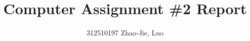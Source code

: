\documentclass[a4paper, onecolumn, , 11pt]{IEEEtran}
\begin{document}


    \title{\huge Computer Assignment \#2 Report}
    \author{312510197 Zhao-Jie, Luo}


    \maketitle


\end{document}
